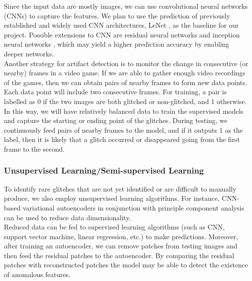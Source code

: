 \documentclass[12pt]{article}
\begin{document}
\noindent Since the input data are mostly images, we can use convolutional neural networks (CNNs) to capture the features. We plan to use the prediction of previously established and widely used CNN architectures, LeNet \cite{726791}, as the baseline for our project. Possible extensions to CNN are residual neural networks and inception neural networks \cite{DBLP:journals/corr/HeZRS15, DBLP:journals/corr/SzegedyLJSRAEVR14}, which may yield a higher prediction accuracy by enabling deeper networks.\\

\noindent Another strategy for artifact detection is to monitor the change in consecutive (or nearby) frames in a video game. If we are able to gather enough video recordings of the games, then we can obtain pairs of nearby frames to form new data points. Each data point will include two consecutive frames. For training, a pair is labelled as 0 if the two images are both glitched or non-glitched, and 1 otherwise. In this way, we will have relatively balanced data to train the supervised models and capture the starting or ending point of the glitches. During testing, we continuously feed pairs of nearby frames to the model, and if it outputs 1 as the label, then it is likely that a glitch occurred or disappeared going from the first frame to the second.

\subsubsection{Unsupervised Learning/Semi-supervised Learning}
To identify rare glitches that are not yet identified or are difficult to manually produce, we also employ unsupervised learning algorithms. For instance, CNN-based variational autoencoders in conjunction with principle component analysis can be used to reduce data dimensionality. \\


\noindent Reduced data can be fed to supervised learning algorithms (such as CNN, support vector machine, linear regression, etc.) to make predictions. Moreover, after training an autoencoder, we can remove patches from testing images and then feed the residual patches to the autoencoder. By comparing the residual patches with reconstructed patches the model may be able to detect the existence of anomalous features.\\

\end{document}
